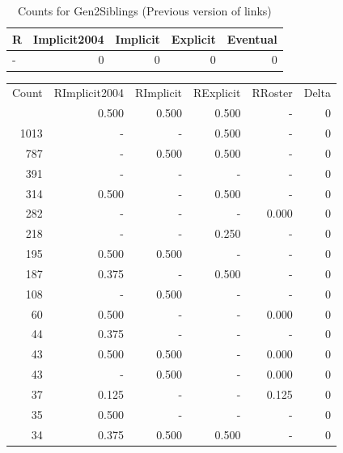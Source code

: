 \documentclass[a4paper]{article}\usepackage{graphicx, color}
\begin{document}
\begin{table}[ht]
\centering
{\large
\begin{tabular}{lrrrr}
  \hline
R & Implicit2004 & Implicit & Explicit & Eventual \\ 
  \hline
- &   0 &   0 &   0 &   0 \\ 
   \hline
\end{tabular}
}
\caption{Counts for Gen2Siblings (Previous version of links)} 
\end{table}



\begin{table}[ht]
\centering
\begin{tabular}{rrrrrr}
  \hline
Count & RImplicit2004 & RImplicit & RExplicit & RRoster & Delta \\ 
  \rowcolor{goodColor}  \hline
1192 & 0.500 & 0.500 & 0.500 & - & 0 \\ 
   \rowcolor{sosoColor} 1013 & - & - & 0.500 & - & 0 \\ 
   \rowcolor{goodColor} 787 & - & 0.500 & 0.500 & - & 0 \\ 
   \rowcolor{nullColor} 391 & - & - & - & - & 0 \\ 
   \rowcolor{sosoColor} 314 & 0.500 & - & 0.500 & - & 0 \\ 
   \rowcolor{nullColor} 282 & - & - & - & 0.000 & 0 \\ 
   \rowcolor{sosoColor} 218 & - & - & 0.250 & - & 0 \\ 
  195 & 0.500 & 0.500 & - & - & 0 \\ 
   \rowcolor{sosoColor} 187 & 0.375 & - & 0.500 & - & 0 \\ 
  108 & - & 0.500 & - & - & 0 \\ 
   \rowcolor{nullColor} 60 & 0.500 & - & - & 0.000 & 0 \\ 
   \rowcolor{nullColor} 44 & 0.375 & - & - & - & 0 \\ 
  43 & 0.500 & 0.500 & - & 0.000 & 0 \\ 
  43 & - & 0.500 & - & 0.000 & 0 \\ 
   \rowcolor{nullColor} 37 & 0.125 & - & - & 0.125 & 0 \\ 
   \rowcolor{nullColor} 35 & 0.500 & - & - & - & 0 \\ 
   \rowcolor{goodColor} 34 & 0.375 & 0.500 & 0.500 & - & 0 \\ 

\end{tabular}
\end{table}
\end{document}
